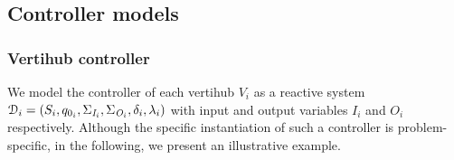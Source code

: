 \subsection{Controller models}
\subsubsection*{Vertihub controller}We model the controller of each vertihub $V_i$ as a reactive system $\mathcal{D}_i = (S_i,q_{0_i},\Sigma_{\textit{I}_{i}},\Sigma_{\textit{O}_{i}},\delta_{i},\lambda_{i})$ with input and output variables $I_i$ and $O_i$ respectively. Although the specific instantiation of such a controller is problem-specific, in the following, we present an illustrative example. 

